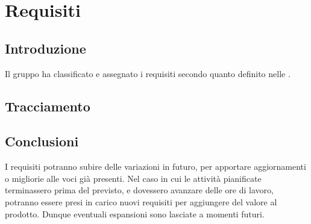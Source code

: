 \section{Requisiti}
\subsection{Introduzione}
Il gruppo \Gruppo{} ha classificato e assegnato i requisiti secondo quanto definito nelle .



\newpage



\newpage

\newpage
\subsection{Tracciamento}



\subsection{Conclusioni}
I requisiti potranno subire delle variazioni in futuro, per apportare aggiornamenti o migliorie alle
voci già presenti. Nel caso in cui le attività pianificate terminassero prima del
previsto, e dovessero avanzare delle ore di lavoro, potranno essere presi in carico nuovi requisiti
per aggiungere del valore al prodotto. Dunque eventuali espansioni sono lasciate a momenti
futuri.